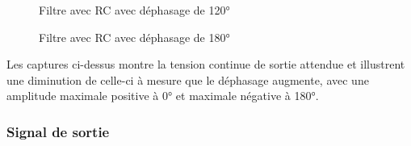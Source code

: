 \begin{figure}[H]
    \begin{minipage}[c]{.50\linewidth}
        \centering
        \caption{Filtre avec RC avec déphasage de 120°}
    \label{fig:f3}
    \end{minipage}
    \hfill%
    \begin{minipage}[c]{.50\linewidth}
        \centering
       \caption{Filtre avec RC avec déphasage de 180°}
 \label{fig:f4}
    \end{minipage}
\end{figure}

Les captures ci-dessus montre la tension continue de sortie attendue et illustrent une diminution de 
celle-ci à mesure que le déphasage
 augmente, avec une amplitude maximale positive à 0° et maximale négative à 180°.

\subsubsection{Signal de sortie}



